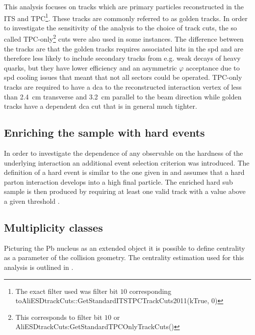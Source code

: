 This analysis focuses on tracks which are primary particles reconstructed in the ITS and TPC\footnote{The exact filter used was filter bit $10$ corresponding to\newline AliESDtrackCuts::GetStandardITSTPCTrackCuts2011(kTrue, 0)}. These tracks are commonly referred to as \gls{golden} tracks. In order to investigate the sensitivity of the analysis to the choice of track cuts, the so called \gls{TPC-only}\footnote{This corresponds to filter bit $10$ or  AliESDtrackCuts:GetStandardTPCOnlyTrackCuts()} cuts were also used in some instances. The difference between the tracks are that the golden tracks requires associated hits in the \gls{spd} and are therefore less likely to include secondary tracks from e.g. weak decays of heavy quarks, but they have lower efficiency and an asymmetric $\varphi$ acceptance due to \gls{spd} cooling issues that meant that not all sectors could be operated. \gls{TPC-only} tracks are required to have a  \gls{dca} to the reconstructed interaction vertex of less than \SI{2.4}{cm} transverse and \SI{3.2}{cm} parallel to the beam direction while golden tracks have a \pt dependent \gls{dca} cut that is in general much tighter.

\subsection{Enriching the sample with hard events}
\label{sec:enrich_hard}

In order to investigate the dependence of any observable on the hardness of the underlying interaction an additional event selection criterion was introduced.
The definition of a hard event is similar to the one given in \cite{Acosta2002} and assumes that a hard parton interaction develops into a high \pt final particle.
The enriched hard sub sample is then produced by requiring at least one valid track with a \pt value above a given threshold \ptthresh. 

\subsection{Multiplicity classes}
\label{sec:mult_classes}
Picturing the \gls{Pb} nucleus as an extended object it is possible to define centrality as a parameter of the collision geometry. The centrality estimation used for this analysis is outlined in \cite{Morsch2013,ALICECollaboration2012}. 

